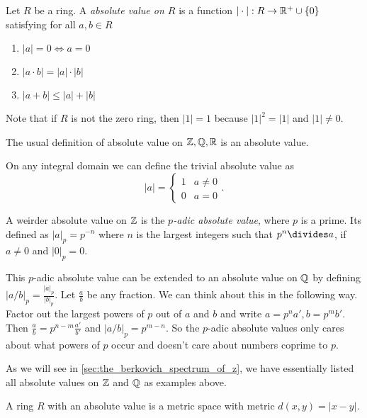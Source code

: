 \begin{definition}
	Let $R$ be a ring. A \emph{absolute value on $R$} is a function
	$|\cdot |: R \to \mathbb{R}^{+} \cup \{0\} $ satisfying for all $a, b \in R$
	\begin{enumerate}
		\item $|a| = 0 \iff a = 0$ 
		\item $|a \cdot b| = |a| \cdot |b|$ 
		\item $|a + b| \le |a| + |b|$
	\end{enumerate}
\end{definition}
Note that if $R$ is not the zero ring, then $|1| = 1$ because $|1|^2 = |1| $ and $|1|\ne 0 $. 
\begin{example}
	The usual definition of absolute value on $\mathbb{Z}, \mathbb{Q}, \mathbb{R}$ is an absolute value. 
\end{example}
\begin{example}
	On any integral domain we can define the trivial absolute value as \[
	 |a| = \begin{cases}
		 1 & a \ne 0 \\
		 0 & a = 0
	 \end{cases}
	.\] 
\end{example}
\begin{example}
	A weirder absolute value on $\mathbb{Z}$ is the \emph{$p$-adic absolute value}, where $p$ is a prime. 
	Its defined as $|a|_p = p^{-n}$ where $n$ is the largest integers such that $p^{n} \divides a$, if $a \ne 0$ and $|0|_p = 0$. 


	This $p$-adic absolute value can be extended to an absolute value on $\mathbb{Q}$ by defining $|a / b|_p = \frac{|a|_p}{|b|_p}$. Let $\frac{a}{b}$ be any fraction. 
	We can think about this in the following way. 
	Factor out the largest powers of $p$ out of $a$ and $b$ and write $a = p^{n} a', b = p^{m} b'$. Then $\frac{a}{ b} = p^{n - m} \frac{a'}{ b'}$ and $|a / b|_p = p^{m - n}$. 
	So the $p$-adic absolute values only cares about what powers of $p$ occur and doesn't care about numbers coprime to $p $.
\end{example}
As we will see in \cref{sec:the_berkovich_spectrum_of_z}, we have essentially listed all absolute values on $\mathbb{Z}$ and $\mathbb{Q}$ as examples above.  
\begin{observation}
	A ring $R$ with an absolute value is a metric space with metric $d(x, y) = |x - y|$. 
\end{observation}
